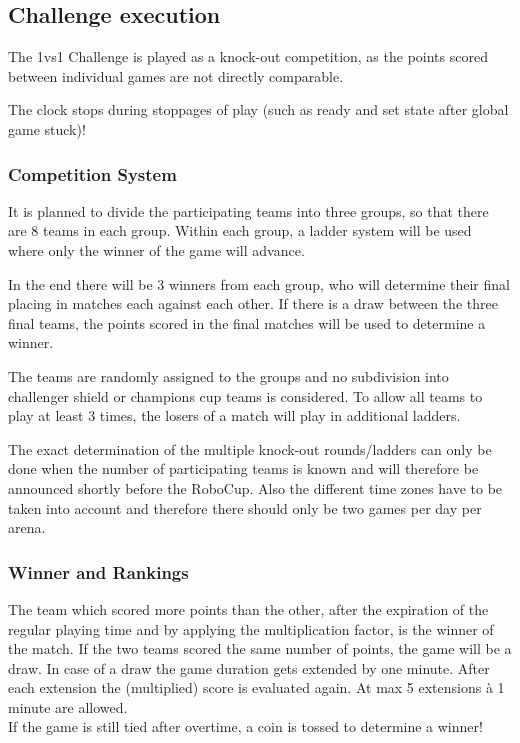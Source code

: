 \subsection{Challenge execution}
The 1vs1 Challenge is played as a knock-out competition, as the points scored between individual games are not directly comparable. 

The clock stops during stoppages of play (such as ready and set state after global game stuck)!

\subsubsection{Competition System}
It is planned to divide the participating teams into three groups, so that there are 8 teams in each group. Within each group, a ladder system will be used where only the winner of the game will advance. 

In the end there will be 3 winners from each group, who will determine their final placing in matches each against each other. If there is a draw between the three final teams, the points scored in the final matches will be used to determine a winner.

The teams are randomly assigned to the groups and no subdivision into challenger shield or champions cup teams is considered.
To allow all teams to play at least 3 times, the losers of a match will play in additional ladders.

The exact determination of the multiple knock-out rounds/ladders can only be done when the number of participating teams is known and will therefore be announced shortly before the RoboCup. Also the different time zones have to be taken into account and therefore there should only be two games per day per arena.
    
\subsubsection{Winner and Rankings}
\label{sec:rankings}

The team which scored more points than the other, after the expiration of the regular playing time and by applying the multiplication factor, is the winner of the match. If the two teams scored the same number of points, the game will be a draw. In case of a draw the game duration gets extended by one minute. After each extension the (multiplied) score is evaluated again. At max 5 extensions à 1 minute are allowed. \\
If the game is still tied after overtime, a coin is tossed to determine a winner!    

